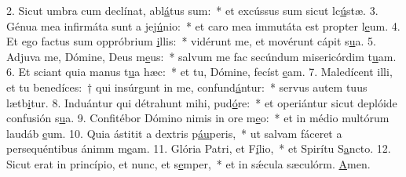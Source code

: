 2. Sicut umbra cum declínat, abl\uline{á}tus sum:~* et excússus sum sicut lc\uline{ú}stæ.
3. Génua mea infirmáta sunt a jej\uline{ú}nio:~* et caro mea immutáta est propter l\uline{e}um.
4. Et ego factus sum oppróbrium \uline{i}llis:~* vidérunt me, et movérunt cápit s\uline{u}a.
5. Adjuva me, Dómine, Deus m\uline{e}us:~* salvum me fac secúndum misericórdim t\uline{u}am.
6. Et sciant quia manus t\uline{u}a hæc:~* et tu, Dómine, fecíst \uline{e}am.
7. Maledícent illi, et tu benedíces:~† qui insúrgunt in me, confund\uline{á}ntur:~* servus autem tuus lætb\uline{i}tur.
8. Induántur qui détrahunt mihi, pud\uline{ó}re:~* et operiántur sicut deplóide confusión s\uline{u}a.
9. Confitébor Dómino nimis in ore m\uline{e}o:~* et in médio multórum laudáb \uline{e}um.
10. Quia ástitit a dextris p\uline{áu}peris,~* ut salvam fáceret a persequéntibus ánimm m\uline{e}am.
11. Glória Patri, et F\uline{í}lio,~* et Spirítu S\uline{a}ncto.
12. Sicut erat in princípio, et nunc, et s\uline{e}mper,~* et in sǽcula sæculórm. \uline{A}men.
